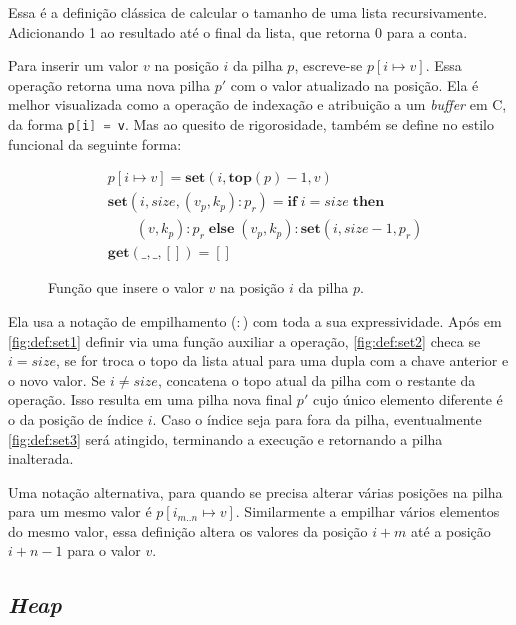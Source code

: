 Essa é a definição clássica de calcular o tamanho de uma lista recursivamente. Adicionando 1 ao resultado até o final da lista, que retorna 0 para a conta.

Para inserir um valor $v$ na posição $i$ da pilha $p$, escreve-se $p[i \mapsto v]$. Essa operação retorna uma nova pilha $p'$ com o valor atualizado na posição. Ela é melhor visualizada como a operação de indexação e atribuição a um \emph{buffer} em C, da forma \lstinline[language=C]|p[i] = v|. Mas ao quesito de rigorosidade, também se define no estilo funcional da seguinte forma:

\begin{figure}[ht]
	\begin{align}
	&p[i \mapsto v] = \mathbf{set}(i, \mathbf{top}(p) - 1, v) \label{fig:def:set1}\\
	&\mathbf{set}(i, size, (v_p, k_p) : p_r) = \mathbf{if}\;i = size \;\mathbf{then} \nonumber\\ 
	&\quad\quad(v, k_p) : p_r\;\mathbf{else}\;(v_p, k_p) : \mathbf{set}(i, size - 1, p_r) \label{fig:def:set2}\\
	&\mathbf{get}(\_, \_, []) = [] \label{fig:def:set3}
	\end{align}
	\caption{Função que insere o valor $v$ na posição $i$ da pilha $p$.}
	\label{fig:def:set}
\end{figure}

Ela usa a notação de empilhamento ($:$) com toda a sua expressividade. Após em \ref{fig:def:set1} definir via uma função auxiliar a operação, \ref{fig:def:set2} checa se $i = size$, se for troca o topo da lista atual para uma dupla com a chave anterior e o novo valor. Se $i \neq size$, concatena o topo atual da pilha com o restante da operação. Isso resulta em uma pilha nova final $p'$ cujo único elemento diferente é o da posição de índice $i$. Caso o índice seja para fora da pilha, eventualmente \ref{fig:def:set3} será atingido, terminando a execução e retornando a pilha inalterada.

Uma notação alternativa, para quando se precisa alterar várias posições na pilha para um mesmo valor é $p[i_{m..n} \mapsto v]$. Similarmente a empilhar vários elementos do mesmo valor, essa definição altera os valores da posição $i + m$ até a posição $i + n - 1$ para o valor $v$.


\subsection{\emph{Heap}}
\label{sec:pcl-back:mem}

